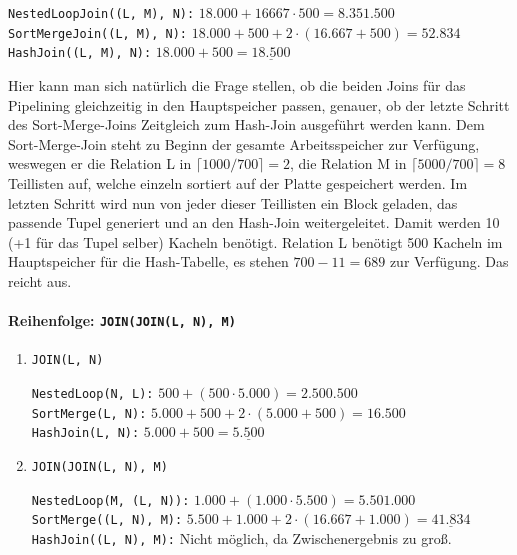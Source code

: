 \begin{enumerate}[a)]
\begin{enumerate}[i)]
\begin{solution}
\begin{enumerate}[1.]
			  \texttt{NestedLoopJoin((L, M), N):} $18.000 + 16667 \cdot 500 = 8.351.500$ \\
			  \texttt{SortMergeJoin((L, M), N):} $18.000 + 500 + 2 \cdot (16.667 + 500) = 52.834$ \\
			  \texttt{HashJoin((L, M), N):} $18.000 + 500 = \underline{18.500}$ \\

		\end{enumerate}

		Hier kann man sich natürlich die Frage stellen, ob die beiden Joins für das Pipelining gleichzeitig in den Hauptspeicher passen, genauer, ob der letzte Schritt des Sort-Merge-Joins Zeitgleich zum Hash-Join ausgeführt werden kann.
		Dem Sort-Merge-Join steht zu Beginn der gesamte Arbeitsspeicher zur Verfügung, weswegen er die Relation L in $\lceil 1000/700\rceil = 2$, die Relation M in $\lceil 5000 / 700 \rceil = 8$ Teillisten auf, welche einzeln sortiert auf der Platte gespeichert werden.
		Im letzten Schritt wird nun von jeder dieser Teillisten ein Block geladen, das passende Tupel generiert und an den Hash-Join weitergeleitet.
		Damit werden 10 (+1 für das Tupel selber) Kacheln benötigt.
		Relation L benötigt 500 Kacheln im Hauptspeicher für die Hash-Tabelle, es stehen $700-11=689$ zur Verfügung.
		Das reicht aus.

		\paragraph{\color{solutioncolor}Reihenfolge: \texttt{JOIN(JOIN(L, N), M)}}

		\begin{enumerate}[1.]

			\item \texttt{JOIN(L, N)}

			  \texttt{NestedLoop(N, L):} $500 + (500 \cdot 5.000) = 2.500.500$ \\
			  \texttt{SortMerge(L, N):} $5.000 + 500 + 2 \cdot (5.000 + 500) = 16.500$ \\
			  \texttt{HashJoin(L, N):} $5.000 + 500 = \underline{5.500}$ \\

			\item \texttt{JOIN(JOIN(L, N), M)}

			  \texttt{NestedLoop(M, (L, N)):} $1.000 + (1.000 \cdot 5.500) = 5.501.000$ \\
			  \texttt{SortMerge((L, N), M):}  $5.500 + 1.000 + 2 \cdot (16.667 + 1.000) = \underline{41.834}$ \\
			\texttt{HashJoin((L, N), M):} Nicht möglich, da Zwischenergebnis zu groß.


\end{enumerate}
\end{solution}
\end{enumerate}
\end{enumerate}
